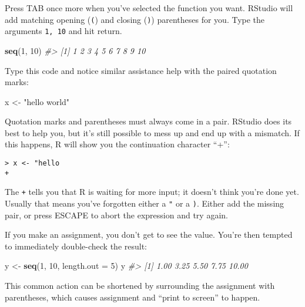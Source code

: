 \documentclass[]{book}
\newenvironment{Shaded}{\begin{snugshade}}{\end{snugshade}}
\newcommand{\KeywordTok}[1]{\textcolor[rgb]{0.13,0.29,0.53}{\textbf{{#1}}}}
\newcommand{\DataTypeTok}[1]{\textcolor[rgb]{0.13,0.29,0.53}{{#1}}}
\newcommand{\DecValTok}[1]{\textcolor[rgb]{0.00,0.00,0.81}{{#1}}}
\newcommand{\StringTok}[1]{\textcolor[rgb]{0.31,0.60,0.02}{{#1}}}
\newcommand{\CommentTok}[1]{\textcolor[rgb]{0.56,0.35,0.01}{\textit{{#1}}}}
\newcommand{\NormalTok}[1]{{#1}}
\begin{document}
Press TAB once more when you've selected the function you want. RStudio
will add matching opening (\texttt{(}) and closing (\texttt{)})
parentheses for you. Type the arguments \texttt{1,\ 10} and hit return.

\begin{Shaded}
\begin{Highlighting}[]
\KeywordTok{seq}\NormalTok{(}\DecValTok{1}\NormalTok{, }\DecValTok{10}\NormalTok{)}
\CommentTok{#>  [1]  1  2  3  4  5  6  7  8  9 10}
\end{Highlighting}
\end{Shaded}

Type this code and notice similar assistance help with the paired
quotation marks:

\begin{Shaded}
\begin{Highlighting}[]
\NormalTok{x <-}\StringTok{ "hello world"}
\end{Highlighting}
\end{Shaded}

Quotation marks and parentheses must always come in a pair. RStudio does
its best to help you, but it's still possible to mess up and end up with
a mismatch. If this happens, R will show you the continuation character
``+'':

\begin{verbatim}
> x <- "hello
+
\end{verbatim}

The \texttt{+} tells you that R is waiting for more input; it doesn't
think you're done yet. Usually that means you've forgotten either a
\texttt{"} or a \texttt{)}. Either add the missing pair, or press ESCAPE
to abort the expression and try again.

If you make an assignment, you don't get to see the value. You're then
tempted to immediately double-check the result:

\begin{Shaded}
\begin{Highlighting}[]
\NormalTok{y <-}\StringTok{ }\KeywordTok{seq}\NormalTok{(}\DecValTok{1}\NormalTok{, }\DecValTok{10}\NormalTok{, }\DataTypeTok{length.out =} \DecValTok{5}\NormalTok{)}
\NormalTok{y}
\CommentTok{#> [1]  1.00  3.25  5.50  7.75 10.00}
\end{Highlighting}
\end{Shaded}

This common action can be shortened by surrounding the assignment with
parentheses, which causes assignment and ``print to screen'' to happen.
\end{document}
